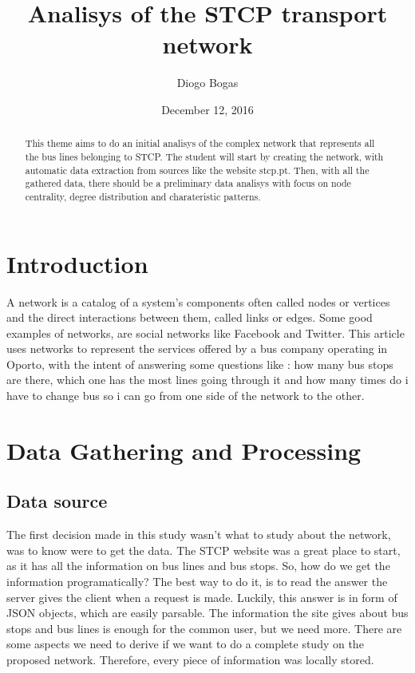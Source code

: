 \documentclass[12pt]{report}
\title{Analisys of the STCP transport network}
\author{Diogo Bogas}
\affil{DCC/FCUP}
\date{December 12, 2016}
\begin{document}
\maketitle
\newpage
{}

\begin{abstract}
This theme aims to do an initial analisys of the complex network that represents all the bus lines belonging to STCP. The student will start by creating the network, with automatic data extraction from sources like the website stcp.pt.
Then, with all the gathered data, there should be a preliminary data analisys with focus on node centrality, degree distribution and charateristic patterns.
\end{abstract}
\pagestyle{empty}
\pagebreak

\section{Introduction}
\begin{comment}
ver fonte da definição de network e acrescentar aqui
\end{comment}

A network is a catalog of a system’s components often called nodes or vertices and the direct interactions  between them, called links or edges.
Some good examples of networks, are social networks like Facebook and Twitter.
This article uses networks to represent the services offered by a bus company operating in Oporto, with the intent of answering some questions like : how many bus stops are there, which one has the most lines going through it and how many times do i have to change bus so i can go from one side of the network to the other. 
 

\section{Data Gathering and Processing}
\subsection{Data source}
The first decision made in this study wasn't what to study about the network, was to know were to get the data. 
The STCP website was a great place to start, as it has all the information on bus lines and bus stops. So, how do we get the information programatically?
The best way to do it, is to read the answer the server gives the client when a request is made. Luckily, this answer is in form of JSON objects, which are easily parsable.
The information the site gives about bus stops and bus lines is enough for the common user, but we need more. There are some aspects we need to derive if we want to do a complete study on the proposed network. Therefore, every piece of information was locally stored.
\end{document}
